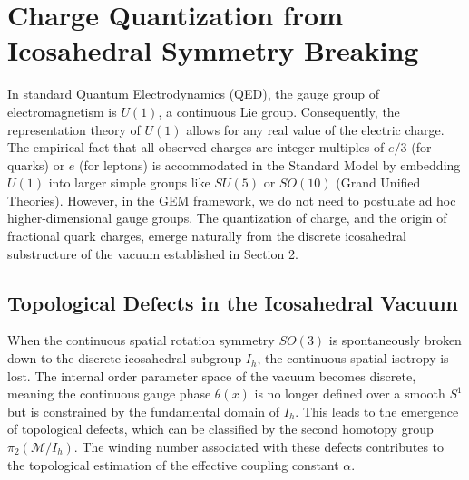 \section{Charge Quantization from Icosahedral Symmetry Breaking}
\label{sec:charge}

In standard Quantum Electrodynamics (QED), the gauge group of electromagnetism is $U(1)$, a continuous Lie group. Consequently, the representation theory of $U(1)$ allows for any real value of the electric charge. The empirical fact that all observed charges are integer multiples of $e/3$ (for quarks) or $e$ (for leptons) is accommodated in the Standard Model by embedding $U(1)$ into larger simple groups like $SU(5)$ or $SO(10)$ (Grand Unified Theories). However, in the GEM framework, we do not need to postulate ad hoc higher-dimensional gauge groups. The quantization of charge, and the origin of fractional quark charges, emerge naturally from the discrete icosahedral substructure of the vacuum established in Section 2.

\subsection{Topological Defects in the Icosahedral Vacuum}
\begin{remark}
When the continuous spatial rotation symmetry $SO(3)$ is spontaneously broken down to the discrete icosahedral subgroup $I_h$, the continuous spatial isotropy is lost. The internal order parameter space of the vacuum becomes discrete, meaning the continuous gauge phase $\theta(x)$ is no longer defined over a smooth $S^1$ but is constrained by the fundamental domain of $I_h$. This leads to the emergence of topological defects, which can be classified by the second homotopy group $\pi_2(\mathcal{M}/I_h)$. The winding number associated with these defects contributes to the topological estimation of the effective coupling constant $\alpha$.
\end{remark}

